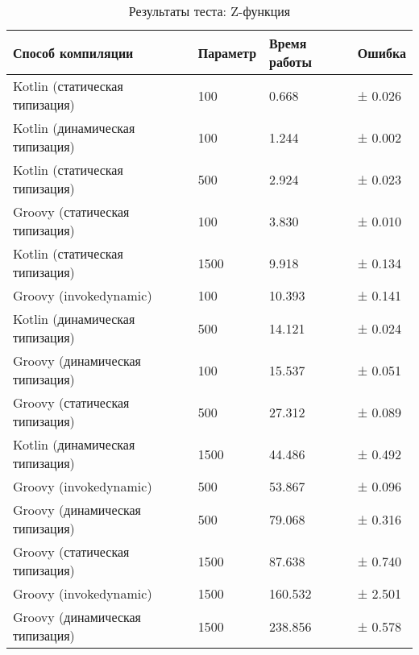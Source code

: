 \begin{table}[h]
\caption{\label{tab:zFunctionBenchResults}Результаты теста: Z-функция}
\begin{center}
\begin{tabular}{|l|l|l|l|}
\hline
Способ компиляции & Параметр	& Время работы & Ошибка \\
\hline
Kotlin (статическая типизация)              &  100  &   0.668 & ± 0.026 \\
Kotlin (динамическая типизация)             &  100  &   1.244 & ± 0.002 \\
Kotlin (статическая типизация)              &  500  &   2.924 & ± 0.023 \\
Groovy (статическая типизация)              &  100  &   3.830 & ± 0.010 \\
Kotlin (статическая типизация)              & 1500  &   9.918 & ± 0.134 \\
Groovy (invokedynamic)                      &  100  &  10.393 & ± 0.141 \\
Kotlin (динамическая типизация)             &  500  &  14.121 & ± 0.024 \\
Groovy (динамическая типизация)             &  100  &  15.537 & ± 0.051 \\
Groovy (статическая типизация)              &  500  &  27.312 & ± 0.089 \\
Kotlin (динамическая типизация)             & 1500  &  44.486 & ± 0.492 \\
Groovy (invokedynamic)                      &  500  &  53.867 & ± 0.096 \\
Groovy (динамическая типизация)             &  500  &  79.068 & ± 0.316 \\
Groovy (статическая типизация)              & 1500  &  87.638 & ± 0.740 \\
Groovy (invokedynamic)                      & 1500  & 160.532 & ± 2.501 \\
Groovy (динамическая типизация)             & 1500  & 238.856 & ± 0.578 \\
\hline
\end{tabular}
\end{center}
\end{table} 


